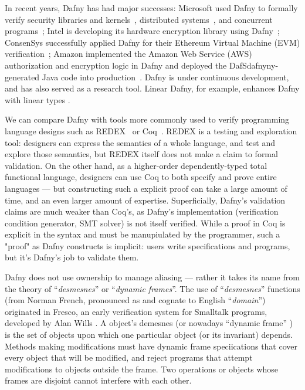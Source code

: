 In recent years, Dafny has had major successes: Microsoft used Dafny to formally verify security libraries and kernels~\cite{DBLP:conf/sosp/KleinEHACDEEKNSTW09,DBLP:journals/sigops/ErbsenPGSC20}, distributed systems~\cite{ironfleet-sosp2015}, and concurrent programs~\cite{DBLP:conf/osdi/HawblitzelHLNPZZ14}; Intel is developing its hardware encryption library using Dafny~\cite{DBLP:journals/iacr/YangWCCY23}; ConsenSys successfully applied Dafny for their Ethereum Virtual Machine (EVM) verification~\cite{cassex-eth-fm2023}; Amazon implemented the Amazon Web Service (AWS) authorization and encryption logic in Dafny and deployed the DafSdafnyny-generated Java code into production~\cite{counterexamples-tacas2022}.
Dafny is under continuous development, and has also served as a
research tool.  Linear Dafny, for example, enhances Dafny with linear
types \cite{linear-dafny-oopsla2022}.


We can compare Dafny with tools more commonly used to verify
programming language designs such as REDEX~\cite{PLTRedex} or
Coq~\cite{coq,coqbook}.  REDEX is a testing and exploration tool:
designers can express the semantics of a whole language, and test and
explore those semantics, but REDEX itself does not make a claim to
formal validation.  On the other hand, as a higher-order
dependently-typed total functional language, designers can use Coq to
both specify and prove entire languages --- but constructing such a
explicit proof can take a large amount of time, and an even larger
amount of expertise.  Superficially, Dafny's validation claims are
much weaker than Coq's, as Dafny's implementation (verification
condition generator, SMT solver) is not itself verified.  While a
proof in Coq is explicit in the syntax and must be manupiulated by the
programmer, such a "proof" as Dafny constructs is implicit: users
write specifications and programs, but it's Dafny's job to validate
them.


Dafny does not use ownership to manage aliasing --- rather it takes
its name from the theory of ``\textit{desmesnes}'' or ``\textit{dynamic frames}''.
The use of ``\textit{desmesnes}'' functions (from Norman French,
pronounced as and cognate to English ``\textit{domain}'') 
originated in Fresco, an early verification system for Smalltalk
programs, developed by Alan Wills \cite{wills91,wills92}.  A object's demesnes
(or nowadays ``dynamic frame''
\cite{dynamic-frames-fm2006,dynamic-frames-fac2011})
is the set of objects upon which one particular
object (or its invariant) depends.
Methods making modifications must
have dynamic frame speciications that cover every object that will be
modified, and reject programs that attempt modifications to objects
outside the frame. Two operations or objects whose frames
are disjoint cannot interfere with each other.
